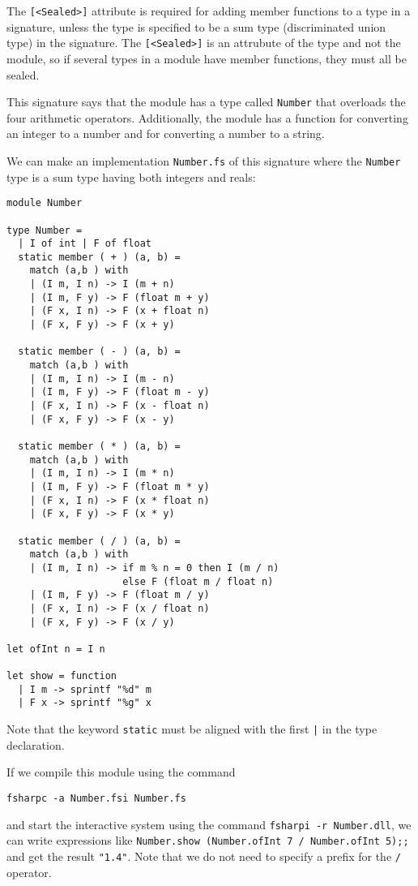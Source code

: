 \documentclass[a4paper]{article}
\begin{document}
\noindent
The \texttt{[<Sealed>]} attribute is required for adding member
functions to a type in a signature, unless the type is specified to be
a sum type (discriminated union type) in the signature.  The
\texttt{[<Sealed>]} is an attrubute of the type and not the module, so
if several types in a module have member functions, they must all be
sealed.

This signature says that the module has a type called \texttt{Number}
that overloads the four arithmetic operators.  Additionally, the
module has a function for converting an integer to a number and for
converting a number to a string.

We can make an implementation \texttt{Number.fs} of this signature
where the \texttt{Number} type is a sum type having both integers and
reals:

\renewcommand{\baselinestretch}{0.9}
\begin{verbatim}
module Number

type Number =
  | I of int | F of float
  static member ( + ) (a, b) =
    match (a,b ) with
    | (I m, I n) -> I (m + n)
    | (I m, F y) -> F (float m + y)
    | (F x, I n) -> F (x + float n)
    | (F x, F y) -> F (x + y)

  static member ( - ) (a, b) =
    match (a,b ) with
    | (I m, I n) -> I (m - n)
    | (I m, F y) -> F (float m - y)
    | (F x, I n) -> F (x - float n)
    | (F x, F y) -> F (x - y)

  static member ( * ) (a, b) =
    match (a,b ) with
    | (I m, I n) -> I (m * n)
    | (I m, F y) -> F (float m * y)
    | (F x, I n) -> F (x * float n)
    | (F x, F y) -> F (x * y)

  static member ( / ) (a, b) =
    match (a,b ) with
    | (I m, I n) -> if m % n = 0 then I (m / n)
                    else F (float m / float n)
    | (I m, F y) -> F (float m / y)
    | (F x, I n) -> F (x / float n)
    | (F x, F y) -> F (x / y)

let ofInt n = I n

let show = function
  | I m -> sprintf "%d" m
  | F x -> sprintf "%g" x
\end{verbatim}
\renewcommand{\baselinestretch}{1}

\noindent
Note that the keyword \texttt{static} must be aligned with the first
\texttt{|} in the type declaration.

If we compile this module using the command

\renewcommand{\baselinestretch}{0.9}
\begin{verbatim}
fsharpc -a Number.fsi Number.fs
\end{verbatim}
\renewcommand{\baselinestretch}{1}

\noindent
and start the interactive system using the command \texttt{fsharpi -r
  Number.dll}, we can write expressions like \texttt{Number.show
  (Number.ofInt 7 / Number.ofInt 5);;} and get the result
\texttt{"1.4"}.  Note that we do not need to specify a prefix for the
\texttt{/} operator.
\end{document}
